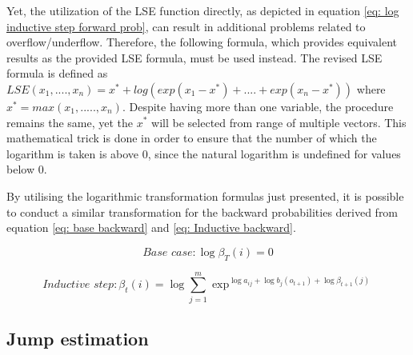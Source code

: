 Yet, the utilization of the LSE function directly, as depicted in equation \ref{eq: log inductive step forward prob}, can result in additional problems related to overflow/underflow. Therefore, the following formula, which provides equivalent results as the provided LSE formula, must be used instead. The revised LSE formula is defined as $LSE(x_1,....,x_n) = x^* + log(exp(x_1-x^*)+....+exp(x_n-x^*))$ where $x^* = max(x_1,.....,x_n)$. Despite having more than one variable, the procedure remains the same, yet the $x^*$ will be selected from range of multiple vectors. This mathematical trick is done in order to ensure that the number of which the logarithm is taken is above 0, since the natural logarithm is undefined for values below 0. 

By utilising the logarithmic transformation formulas just presented, it is possible to conduct a similar transformation for the backward probabilities derived from equation \ref{eq: base backward} and \ref{eq: Inductive backward}. 

\begin{equation}
     \textit{Base case}: \log\beta_T(i) = 0
    \label{eq: log base backward}
\end{equation}

\begin{equation}
    \textit{Inductive step}: \beta_t(i) = \log\sum_{j=1}^m \exp^{\log a_{ij}+\log b_j(o_{t+1})+\log \beta_{t+1}(j)}
    \label{eq: log inductive backward}
\end{equation}


\subsection{Jump estimation}
\label{subsection: Jump theory}

